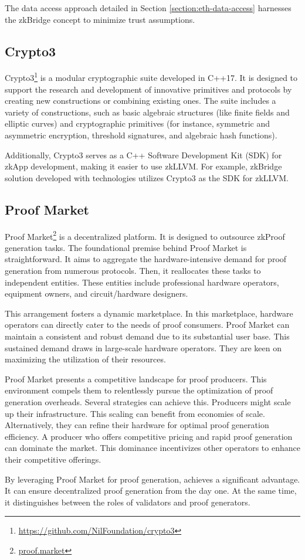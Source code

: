 The data access approach detailed in Section \ref{section:eth-data-access} 
harnesses the zkBridge concept to minimize trust assumptions.

\subsection{Crypto3}

Crypto3\footnote{\url{https://github.com/NilFoundation/crypto3}} 
 is a modular cryptographic suite developed in C++17. 
It is designed to support the research 
 and development of innovative primitives and protocols
 by creating new constructions or combining existing ones. 
The suite includes a variety of constructions, such as basic algebraic structures 
 (like finite fields and elliptic curves) and cryptographic primitives 
 (for instance, symmetric and asymmetric encryption,
  threshold signatures, and algebraic hash functions).

Additionally, Crypto3 serves as a C++ Software Development Kit (SDK) for zkApp development, 
making it easier to use zkLLVM. 
For example, zkBridge solution developed with \nil technologies utilizes Crypto3 
as the SDK for zkLLVM.
 
\subsection{Proof Market}
\label{section:proof-market}

Proof Market\footnote{\url{proof.market}} is a decentralized platform. 
It is designed to outsource zkProof generation tasks. The foundational premise 
behind Proof Market is straightforward. It aims to aggregate the hardware-intensive 
demand for proof generation from numerous protocols. Then, it reallocates these 
tasks to independent entities. These entities include professional hardware operators, 
equipment owners, and circuit/hardware designers.

This arrangement fosters a dynamic marketplace. In this marketplace, hardware 
operators can directly cater to the needs of proof consumers. Proof Market can 
maintain a consistent and robust demand due to its substantial user base. This 
sustained demand draws in large-scale hardware operators. They are keen on 
maximizing the utilization of their resources.

Proof Market presents a competitive landscape for proof producers. This environment 
compels them to relentlessly pursue the optimization of proof generation overheads.
Several strategies can achieve this. Producers might scale up their infrastructure.
This scaling can benefit from economies of scale. Alternatively, they can refine 
their hardware for optimal proof generation efficiency. A producer who offers 
competitive pricing and rapid proof generation can dominate the market. This 
dominance incentivizes other operators to enhance their competitive offerings.

By leveraging Proof Market for proof generation, \protocol achieves a significant 
advantage. It can ensure decentralized proof generation from the day one. At the 
same time, it distinguishes between the roles of validators and proof generators.
